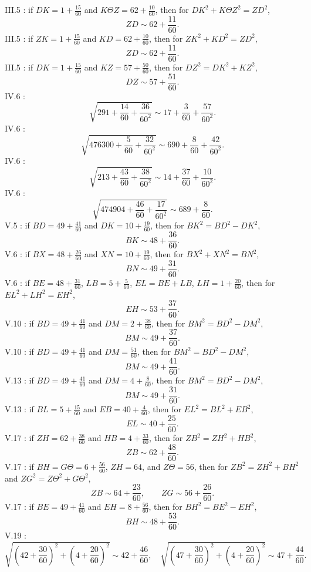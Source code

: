 \documentclass{amsart}
\theoremstyle{definition}
\begin{document}
 
III.5 \cite[p.~158]{almagest}: if $DK=1+\frac{15}{60}$ and $K\Theta Z=62+\frac{10}{60}$, then for
$DK^2+K\Theta Z^2=ZD^2$,
\[
ZD \sim 62+\frac{11}{60}.
\]
III.5 \cite[p.~160]{almagest}: if $ZK=1+\frac{15}{60}$ and $KD=62+\frac{10}{60}$,
then for $ZK^2+KD^2=ZD^2$,
\[
ZD \sim 62+\frac{11}{60}.
\]
III.5 \cite[p.~162]{almagest}: if $DK=1+\frac{15}{60}$ and $KZ=57+\frac{50}{60}$, then for
$DZ^2=DK^2+KZ^2$,
\[
DZ \sim 57+\frac{51}{60}.
\]
IV.6 \cite[pp.~195--196]{almagest}:
\[
\sqrt{291+\frac{14}{60}+\frac{36}{60^2}} \sim 17 + \frac{3}{60}+\frac{57}{60^2}. 
\]
IV.6 \cite[p.~197]{almagest}:
\[
\sqrt{476300+\frac{5}{60}+\frac{32}{60^2}} \sim 690+\frac{8}{60}+\frac{42}{60^2}.
\]
IV.6 \cite[p.~201]{almagest}:
\[
\sqrt{213+\frac{43}{60}+\frac{38}{60^2}} \sim  14+\frac{37}{60}+\frac{10}{60^2}.
\]
IV.6 \cite[pp.~201--202]{almagest}:
\[
\sqrt{474904+\frac{46}{60}+\frac{17}{60^2}} \sim 689+\frac{8}{60}.
\]
V.5 \cite[p.~231]{almagest}: if $BD=49+\frac{41}{60}$ and $DK = 10+\frac{19}{60}$, then for
$BK^2=BD^2-DK^2$,
\[
BK \sim 48 + \frac{36}{60}.
\]
V.6 \cite[p.~234]{almagest}: if $BX=48+\frac{26}{60}$ and $XN=10+\frac{19}{60}$, then for
$BX^2+XN^2=BN^2$,
\[
BN \sim 49+ \frac{31}{60}.
\]
V.6 \cite[p.~234]{almagest}: if $BE=48+\frac{31}{60}$, $LB=5+\frac{5}{60}$, $EL=BE+LB$,
$LH=1+\frac{20}{60}$, then for $EL^2+LH^2=EH^2$,
\[
EH \sim 53+\frac{37}{60}.
\]
V.10 \cite[p.~241]{almagest}: if $BD=49+\frac{41}{60}$ and $DM=2+\frac{38}{60}$, then  for
$BM^2=BD^2-DM^2$,
\[
BM \sim 49+ \frac{37}{60}.
\]
V.10 \cite[p.~242]{almagest}: if $BD=49+\frac{41}{60}$ and $DM=\frac{51}{60}$, then for
$BM^2=BD^2-DM^2$,
\[
BM \sim 49+\frac{41}{60}.
\]
V.13 \cite[p.~250]{almagest}: if $BD=49+\frac{41}{60}$ and $DM=4+\frac{8}{60}$, then for $BM^2=BD^2-DM^2$,
\[
BM \sim 49+\frac{31}{60}.
\]
V.13 \cite[p.~251]{almagest}: if $BL=5+\frac{15}{60}$ and $EB=40+\frac{4}{60}$, then for $EL^2=BL^2+EB^2$,
\[
EL \sim 40+\frac{25}{60}.
\]
V.17 \cite[p.~261]{almagest}: if $ZH=62+\frac{38}{60}$ and $HB=4+\frac{33}{60}$, then for
$ZB^2=ZH^2+HB^2$,
\[
ZB \sim 62+\frac{48}{60}.
\]
V.17 \cite[p.~262]{almagest}: if $BH=G\Theta=6+\frac{56}{60}$, $ZH=64$, and $Z\Theta=56$, then for
$ZB^2=ZH^2+BH^2$ and $ZG^2=Z\Theta^2+G\Theta^2$,
\[
ZB \sim 64+\frac{23}{60}, \qquad ZG \sim 56+\frac{26}{60}.
\]
V.17 \cite[p.~263]{almagest}: if $BE=49+\frac{41}{60}$ and $EH=8+\frac{56}{60}$, then for $BH^2=BE^2-EH^2$,
\[
BH \sim 48+\frac{53}{60}.
\]
V.19 \cite[p.~273]{almagest}:
\[
\sqrt{\left(42+\frac{30}{60}\right)^2 + \left(4+\frac{20}{60} \right)^2} \sim 42+\frac{46}{60},
\quad
\sqrt{\left(47+\frac{30}{60}\right)^2 + \left(4+\frac{20}{60} \right)^2} \sim 47+\frac{44}{60}.
\]
\end{document}
